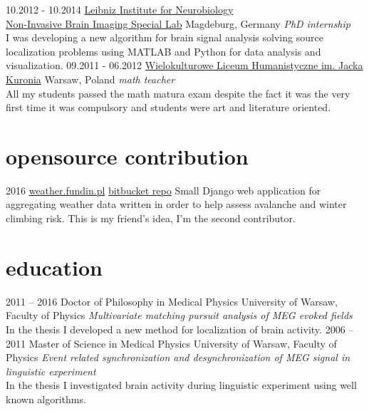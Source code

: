 \documentclass[]{friggeri-cv}
\begin{document}
\begin{entrylist}
  \entry
    {10.2012 - 10.2014}
    {\href{http://www.lin-magdeburg.de/}{Leibniz Institute for Neurobiology\\Non-Invasive Brain Imaging Special Lab}}
    {Magdeburg, Germany}
    {\textit{PhD internship}\\
    I was developing a new algorithm for brain signal analysis solving source localization problems using MATLAB and Python for data analysis and visualization.}
  \entry
    {09.2011 - 06.2012}
    {\href{http://wlh.edu.pl/}{Wielokulturowe Liceum Humanistyczne im. Jacka Kuronia}}
    {Warsaw, Poland}
    {\textit{math teacher}\\
    All my students passed the math matura exam despite the fact it was the very ﬁrst time it was compulsory and students were art and literature oriented.}
\end{entrylist}

\newpage

\section{opensource contribution}

\begin{entrylist}
  \entry
    {2016}
    {\href{https://weather.fundin.pl/}{weather.fundin.pl}}
    {\href{https://bitbucket.org/jt1/weather_history}{bitbucket repo}}
    {Small Django web application for aggregating weather data written in order to help assess avalanche and winter climbing risk. This is my friend's idea, I'm the second contributor.}
\end{entrylist}

\section{education}

\begin{entrylist}
  \entry
    {2011 – 2016}
    {Doctor {\normalfont of Philosophy in Medical Physics}}
    {University of Warsaw, Faculty of Physics}
    {\textit{Multivariate matching pursuit analysis of MEG evoked fields}\\
    In the thesis I developed a new method for localization of brain activity.}
  \entry
    {2006 – 2011}
    {Master {\normalfont of Science in Medical Physics}}
    {University of Warsaw, Faculty of Physics}
    {\textit{Event related synchronization and desynchronization of MEG signal in linguistic experiment}\\
    In the thesis I investigated brain activity during linguistic experiment using well known algorithms.}
\end{entrylist}
\end{document}
